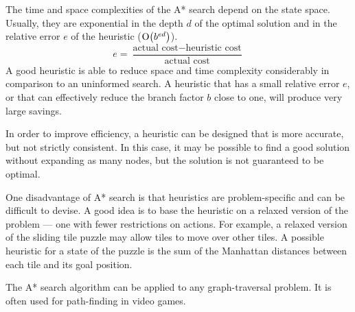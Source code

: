 The time and space complexities of the A* search depend on the state space.
Usually, they are exponential in the depth \( d \) of the optimal solution and in the relative error \( e \) of the heuristic (\( \mathrm{O}\!\left( b^{ed} \right) \)).
\begin{equation*}
  e = \frac{\text{actual cost} - \text{heuristic cost}}{\text{actual cost}}
\end{equation*}
A good heuristic is able to reduce space and time complexity considerably in comparison to an uninformed search.
A heuristic that has a small relative error \( e \), or that can effectively reduce the branch factor \( b \) close to one, will produce very large savings.

In order to improve efficiency, a heuristic can be designed that is more accurate, but not strictly consistent.
In this case, it may be possible to find a good solution without expanding as many nodes, but the solution is not guaranteed to be optimal.

One disadvantage of A* search is that heuristics are problem-specific and can be difficult to devise.
A good idea is to base the heuristic on a relaxed version of the problem --- one with fewer restrictions on actions.
For example, a relaxed version of the sliding tile puzzle may allow tiles to move over other tiles.
A possible heuristic for a state of the puzzle  is the sum of the Manhattan distances between each tile and its goal position.

The A* search algorithm can be applied to any graph-traversal problem.
It is often used for path-finding in video games.
